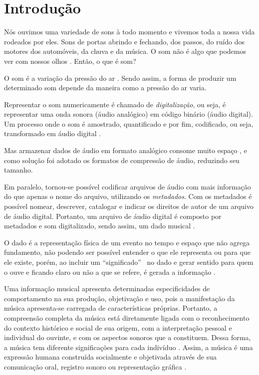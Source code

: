 \chapter{Introdução}
Nós ouvimos uma variedade de sons à todo momento e vivemos toda a nossa vida rodeados por eles. Sons de portas abrindo e fechando, dos passos, do ruído dos motores dos automóveis, da chuva e da música. O som não é algo que podemos ver com nossos olhos \cite{miletto2004}. Então, o que é som?

O som é a variação da pressão do ar \cite{muller2007}. Sendo assim, a forma de produzir um determinado som depende da maneira como a pressão do ar varia. 

Representar o som numericamente é chamado de \textit{digitalização}, ou seja, é representar uma onda sonora (áudio analógico) em código binário (áudio digital). Um processo onde o som é amostrado, quantificado e por fim, codificado, ou seja, transformado em áudio digital \cite{paulozuben2004}.

Mas armazenar dados de áudio em formato analógico consome muito espaço \cite{juliana2004}, e como solução foi adotado os formatos de compressão de áudio, reduzindo seu tamanho.

Em paralelo, tornou-se possível codificar arquivos de áudio com mais informação do que apenas o nome do arquivo, utilizando os \textit{metadados}. Com os metadados é possível nomear, descrever, catalogar e indicar os direitos de autor de um arquivo de áudio digital. Portanto, um arquivo de áudio digital é composto por metadados e som digitalizado, sendo assim, um dado musical . 

O dado é a representação física de um evento no tempo e espaço que não agrega fundamento, não podendo ser possível entender o que ele representa ou para que ele existe, porém, ao incluir um “significado” \ no dado e gerar sentido para quem o ouve e ficando claro ou não a que se refere, é gerada a informação \cite{rafael2013}.

Uma informação musical apresenta determinadas especificidades de comportamento na sua produção, objetivação e uso, pois a manifestação da música apresenta-se carregada de características próprias. Portanto, a compreensão completa da música está diretamente ligada com o reconhecimento do contexto histórico e social de sua origem, com a interpretação pessoal e individual do ouvinte, e com os aspectos sonoros que a constituem. Dessa forma, a música tem diferente significações para cada indivíduo \cite{michels1992}. Assim, a música é uma expressão humana construída socialmente e objetivada através de sua comunicação oral, registro sonoro ou representação gráfica \cite{barros2012}.

